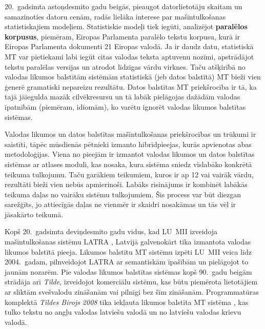 \begin{multicols}{2}
20.~gadsimta astoņdesmito gadu beigās, pieaugot datorlietotāju skaitam un samazinoties datoru cenām, radās lielāka interese par mašīntulkošanas statistiskajiem modeļiem. 
Statistiskie modeļi tiek iegūti, analizējot \textbf{paralēlos korpusus}, piemēram, Eiropas Parlamenta paralēlo tekstu korpusu, kurā ir Eiropas Parlamenta dokumenti 21 Eiropas valodā. 
Ja ir daudz datu, statistiskā MT var pietiekami labi iegūt citas valodas teksta aptuvenu nozīmi, apstrādājot tekstu paralēlas versijas un atrodot līdzīgas vārdu virknes. 
Taču atšķirībā no valodas likumos balstītām sistēmām statistiskā (jeb datos balstītā) MT bieži vien ģenerē gramatiski nepareizu rezultātu. 
Datos balstītas MT priekšrocība ir tā, ka tajā jāiegulda mazāk cilvēkresursu un tā labāk pielāgojas dažādām valodas īpatnībām (piemēram, idiomām), ko varētu ignorēt valodas likumos balstītas sistēmas. 


Valodas likumos un datos balstītas mašīntulkošanas priekšrocības un trūkumi ir saistīti, tāpēc mūsdienās pētnieki izmanto hibrīdpieejas, kurās apvienotas abas metodoloģijas. 
Viena no pieejām ir izmantot valodas likumos un datos balstītas sistēmas ar atlases moduli, kas nosaka, kura sistēma sniedz vislabāko konkrētā teikuma tulkojumu. 
Taču garākiem teikumiem, kuros ir ap 12 vai vairāk vārdu, rezultāti bieži vien nebūs apmierinoši. 
Labāks risinājums ir kombinēt labākās teikuma daļas no vairāku sistēmu tulkojumiem. 
Šis process var būt diezgan sarežģīts, jo attiecīgās daļas ne vienmēr ir skaidri nosakāmas un tās vēl ir jāsakārto teikumā. 

Kopš 20.~gadsimta deviņdesmito gadu vidus, kad LU~MII izveidoja mašīntulkošanas sistēmu LATRA \cite{Meta23}, Latvijā galvenokārt tika izmantota valodas likumos balstītā pieeja.
Likumos balstītu MT sistēmu izpēti LU~MII veica līdz 2004.~gadam, pilnveidojot LATRA ar semantiskām īpašībām un pielāgojot to jaunām nozarēm.
Pie valodas likumos balstītas sistēmas kopš 90.~gadu beigām strādāja arī \textit{Tilde}, izveidojot komerciālu sistēmu, kas būtu piemērota lietotājiem ar sliktām svešvalodu zināšanām vai pilnīgi bez šīm zināšanām.
Programmatūras komplektā \textit{Tildes Birojs 2008} tika iekļauta likumos balstīta MT sistēma \cite{Meta24}, kas tulko tekstu no angļu valodas latviešu valodā un no latviešu valodas krievu valodā. 


\end{multicols}
